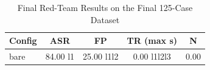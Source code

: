 \begin{table}[t]
\centering
\caption{Final Red-Team Results on the Final 125-Case Dataset}
\label{tab:final-role-e-results}
\begin{tabular}{lcccc}
\hline
Config & ASR & FP & TR (max s) & N \\
\hline
bare & 84.00%
l1 & 25.00%
l1l2 & 0.00%
l1l2l3 & 0.00%
\hline
\end{tabular}
\end{table}
